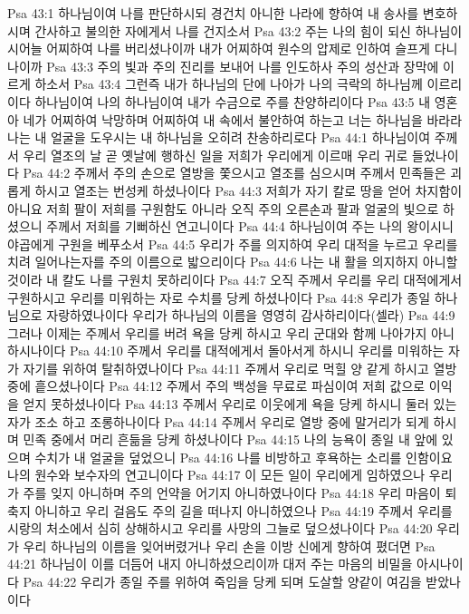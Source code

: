 Psa 43:1  하나님이여 나를 판단하시되 경건치 아니한 나라에 향하여 내 송사를 변호하시며 간사하고 불의한 자에게서 나를 건지소서
Psa 43:2  주는 나의 힘이 되신 하나님이시어늘 어찌하여 나를 버리셨나이까 내가 어찌하여 원수의 압제로 인하여 슬프게 다니나이까
Psa 43:3  주의 빛과 주의 진리를 보내어 나를 인도하사 주의 성산과 장막에 이르게 하소서
Psa 43:4  그런즉 내가 하나님의 단에 나아가 나의 극락의 하나님께 이르리이다 하나님이여 나의 하나님이여 내가 수금으로 주를 찬양하리이다
Psa 43:5  내 영혼아 네가 어찌하여 낙망하며 어찌하여 내 속에서 불안하여 하는고 너는 하나님을 바라라 나는 내 얼굴을 도우시는 내 하나님을 오히려 찬송하리로다
Psa 44:1  하나님이여 주께서 우리 열조의 날 곧 옛날에 행하신 일을 저희가 우리에게 이르매 우리 귀로 들었나이다
Psa 44:2  주께서 주의 손으로 열방을 쫓으시고 열조를 심으시며 주께서 민족들은 괴롭게 하시고 열조는 번성케 하셨나이다
Psa 44:3  저희가 자기 칼로 땅을 얻어 차지함이 아니요 저희 팔이 저희를 구원함도 아니라 오직 주의 오른손과 팔과 얼굴의 빛으로 하셨으니 주께서 저희를 기뻐하신 연고니이다
Psa 44:4  하나님이여 주는 나의 왕이시니 야곱에게 구원을 베푸소서
Psa 44:5  우리가 주를 의지하여 우리 대적을 누르고 우리를 치려 일어나는자를 주의 이름으로 밟으리이다
Psa 44:6  나는 내 활을 의지하지 아니할 것이라 내 칼도 나를 구원치 못하리이다
Psa 44:7  오직 주께서 우리를 우리 대적에게서 구원하시고 우리를 미워하는 자로 수치를 당케 하셨나이다
Psa 44:8  우리가 종일 하나님으로 자랑하였나이다 우리가 하나님의 이름을 영영히 감사하리이다(셀라)
Psa 44:9  그러나 이제는 주께서 우리를 버려 욕을 당케 하시고 우리 군대와 함께 나아가지 아니하시나이다
Psa 44:10  주께서 우리를 대적에게서 돌아서게 하시니 우리를 미워하는 자가 자기를 위하여 탈취하였나이다
Psa 44:11  주께서 우리로 먹힐 양 같게 하시고 열방 중에 흩으셨나이다
Psa 44:12  주께서 주의 백성을 무료로 파심이여 저희 값으로 이익을 얻지 못하셨나이다
Psa 44:13  주께서 우리로 이웃에게 욕을 당케 하시니 둘러 있는 자가 조소 하고 조롱하나이다
Psa 44:14  주께서 우리로 열방 중에 말거리가 되게 하시며 민족 중에서 머리 흔듦을 당케 하셨나이다
Psa 44:15  나의 능욕이 종일 내 앞에 있으며 수치가 내 얼굴을 덮었으니
Psa 44:16  나를 비방하고 후욕하는 소리를 인함이요 나의 원수와 보수자의 연고니이다
Psa 44:17  이 모든 일이 우리에게 임하였으나 우리가 주를 잊지 아니하며 주의 언약을 어기지 아니하였나이다
Psa 44:18  우리 마음이 퇴축지 아니하고 우리 걸음도 주의 길을 떠나지 아니하였으나
Psa 44:19  주께서 우리를 시랑의 처소에서 심히 상해하시고 우리를 사망의 그늘로 덮으셨나이다
Psa 44:20  우리가 우리 하나님의 이름을 잊어버렸거나 우리 손을 이방 신에게 향하여 폈더면
Psa 44:21  하나님이 이를 더듬어 내지 아니하셨으리이까 대저 주는 마음의 비밀을 아시나이다
Psa 44:22  우리가 종일 주를 위하여 죽임을 당케 되며 도살할 양같이 여김을 받았나이다

